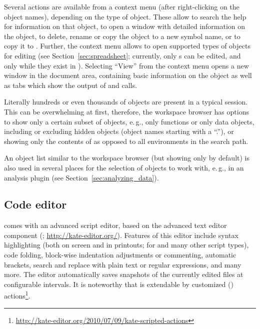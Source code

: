 Several actions are available from a context menu (after right-clicking
on the object names), depending on the type of object. These allow to search the
 help for information on that object, to
open a window with detailed information on the object, to delete, rename or copy the object to a new symbol name, or to
copy it to . Further, the context menu allows to open
supported types of objects for editing (see Section~\ref{sec:spreadsheet}; currently, only
s can be edited, and only while they exist in ). 
Selecting ``View'' from the 
context menu opens a new window in the
document area, containing basic information on the object as well as 
tabs which show the output of
 and  calls.

Literally hundreds or even thousands of objects are present in a typical
 session. This can be overwhelming at
first, therefore, the workspace browser has options to show only a certain
subset of objects, e.\,g., only functions or only data objects, including
or excluding hidden objects (object names starting with a 
``.''), or showing only the contents of  as
opposed to all environments in the search path.

An object list similar to the workspace browser (but showing only 
 by default) is also used in several places for the
selection of objects to work with, e.\,g., in an analysis plugin (see Section~\ref{sec:analyzing_data}).


\subsection{Code editor}
\label{sec:code_editor}

 comes with an advanced
 script editor, based on the
 advanced text editor component (; \url{http://kate-editor.org/}). Features of this
editor include syntax highlighting (both on screen and in printouts; for
 and many other script types), code
folding, block-wise indentation adjustments or commenting, automatic
brackets, search and replace with plain text or regular expressions,
and many more. The editor automatically saves snapshots of the
currently edited files at configurable intervals. 
It is noteworthy that  is extendable by 
customized  () actions\footnote{\url{http://kate-editor.org/2010/07/09/kate-scripted-actions}}.

